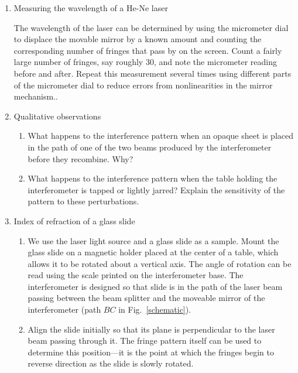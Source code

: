 \begin{enumerate}
\item \label{proc:lambda} Measuring the wavelength of a He-Ne laser

The wavelength of the laser can be determined by using the micrometer
dial to displace the movable mirror by a known amount and counting
the corresponding number of fringes that pass by on the screen.
Count a fairly large number of fringes, say roughly 30, and note the
micrometer reading before and after.  Repeat this measurement several
times using different parts of the micrometer dial to reduce errors from
nonlinearities in the mirror mechanism..

\item Qualitative observations

\begin{enumerate}
\item What happens to the interference pattern when an opaque sheet 
is placed in the path of one of the two beams produced by the 
interferometer before they recombine. Why?

\item What happens to the interference pattern when the table holding 
the interferometer is tapped or lightly jarred? Explain the sensitivity 
of the pattern to these perturbations.
\end{enumerate}

\item Index of refraction of a glass slide 

\begin{enumerate}
\item We use the laser light source and a glass slide as a sample.
Mount the glass slide on a magnetic holder placed at the center of a
table, which allows it to be rotated about a vertical axis.  The angle of
rotation can be read using the scale printed on the interferometer base.
The interferometer is designed so that slide is in the path of the laser
beam passing between the beam splitter and the moveable mirror of the
interferometer (path $BC$ in Fig.~\ref{schematic}).

\item Align the slide initially so that its plane is perpendicular to the laser
  beam passing through it. The fringe pattern itself can be used to determine
  this position---it is the point at which the fringes begin to reverse
  direction as the slide is slowly rotated.


\end{enumerate}
\end{enumerate}
